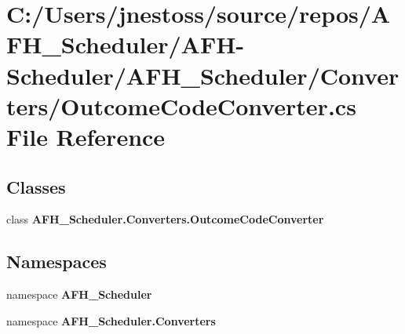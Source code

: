 \section{C\+:/\+Users/jnestoss/source/repos/\+A\+F\+H\+\_\+\+Scheduler/\+A\+F\+H-\/\+Scheduler/\+A\+F\+H\+\_\+\+Scheduler/\+Converters/\+Outcome\+Code\+Converter.cs File Reference}
\label{_outcome_code_converter_8cs}
\subsection*{Classes}
\begin{DoxyCompactItemize}
\item 
class \textbf{ A\+F\+H\+\_\+\+Scheduler.\+Converters.\+Outcome\+Code\+Converter}
\end{DoxyCompactItemize}
\subsection*{Namespaces}
\begin{DoxyCompactItemize}
\item 
namespace \textbf{ A\+F\+H\+\_\+\+Scheduler}
\item 
namespace \textbf{ A\+F\+H\+\_\+\+Scheduler.\+Converters}
\end{DoxyCompactItemize}
